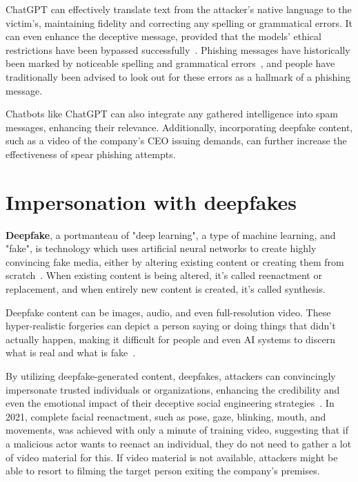 ChatGPT can effectively translate text from the attacker’s native language to the victim’s, maintaining fidelity and correcting any spelling or grammatical errors. It can even enhance the deceptive message, provided that the models' ethical restrictions have been bypassed successfully~\citep{gupta_From_ChatGPT_to_ThreatGPT_2023}.
Phishing messages have historically been marked by noticeable spelling and grammatical errors~\citep{herley_So_Long_No_Thanks_Externalities_2009}, and people have traditionally been advised to look out for these errors as a hallmark of a phishing message.


Chatbots like ChatGPT can also integrate any gathered intelligence into spam messages, enhancing their relevance. Additionally, incorporating deepfake content, such as a video of the company’s CEO issuing demands, can further increase the effectiveness of spear phishing attempts.



\section{Impersonation with deepfakes}
\begin{comment}

    - How deepfake models are trained?

\end{comment}

\textbf{Deepfake}, a portmanteau of "deep learning", a type of machine learning, and "fake", is technology which uses artificial neural networks to create highly convincing fake media, either by altering existing content or creating them from scratch~\citep{mirsky_Creation_Detection_Deepfakes_2021}. When existing content is being altered, it's called reenactment or replacement, and when entirely new content is created, it's called synthesis.

Deepfake content can be images, audio, and even full-resolution video. These hyper-realistic forgeries can depict a person saying or doing things that didn't actually happen, making it difficult for people and even AI systems to discern what is real and what is fake~\citep{blauth_AI_Crime_Overview_Malicious_Use_Abuse_2022}.


By utilizing deepfake-generated content, deepfakes, attackers can convincingly impersonate trusted individuals or organizations, enhancing the credibility and even the emotional impact of their deceptive social engineering strategies~\citep{mirsky_Creation_Detection_Deepfakes_2021}. In 2021, complete facial reenactment, such as pose, gaze, blinking, mouth, and movements, was achieved with only a minute of training video, suggesting that if a malicious actor wants to reenact an individual, they do not need to gather a lot of video material for this. If video material is not available, attackers might be able to resort to filming the target person exiting the company's premises.




